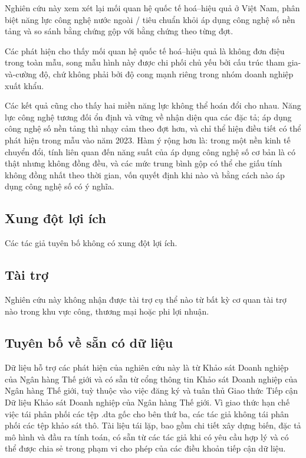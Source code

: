 \documentclass[12pt,a4paper]{article}
\begin{document}
Nghiên cứu này xem xét lại mối quan hệ quốc tế hoá--hiệu quả ở Việt Nam,
phân biệt năng lực công nghệ nước ngoài / tiêu chuẩn khỏi áp dụng công
nghệ số nền tảng và so sánh bằng chứng gộp với bằng chứng theo từng đợt.

Các phát hiện cho thấy mối quan hệ quốc tế hoá--hiệu quả là không đơn
điệu trong toàn mẫu, song mẫu hình này được chi phối chủ yếu bởi cấu
trúc tham gia-và-cường độ, chứ không phải bởi độ cong mạnh riêng trong
nhóm doanh nghiệp xuất khẩu.

Các kết quả cũng cho thấy hai miền năng lực không thể hoán đổi cho nhau.
Năng lực công nghệ tương đối ổn định và vững về nhận diện qua các đặc
tả; áp dụng công nghệ số nền tảng thì nhạy cảm theo đợt hơn, và chỉ thể
hiện điều tiết có thể phát hiện trong mẫu vào năm 2023. Hàm ý rộng hơn
là: trong một nền kinh tế chuyển đổi, tính liên quan đến năng suất của
áp dụng công nghệ số cơ bản là có thật nhưng không đồng đều, và các mức
trung bình gộp có thể che giấu tính không đồng nhất theo thời gian, vốn
quyết định khi nào và bằng cách nào áp dụng công nghệ số có ý nghĩa.

\hypertarget{xung-ux111ux1ed9t-lux1ee3i-uxedch}{%
\subsection{Xung đột lợi ích}\label{xung-ux111ux1ed9t-lux1ee3i-uxedch}}

Các tác giả tuyên bố không có xung đột lợi ích.

\hypertarget{tuxe0i-trux1ee3}{%
\subsection{Tài trợ}\label{tuxe0i-trux1ee3}}

Nghiên cứu này không nhận được tài trợ cụ thể nào từ bất kỳ cơ quan tài
trợ nào trong khu vực công, thương mại hoặc phi lợi nhuận.

\hypertarget{tuyuxean-bux1ed1-vux1ec1-sux1eb5n-cuxf3-dux1eef-liux1ec7u}{%
\subsection{Tuyên bố về sẵn có dữ
liệu}\label{tuyuxean-bux1ed1-vux1ec1-sux1eb5n-cuxf3-dux1eef-liux1ec7u}}

Dữ liệu hỗ trợ các phát hiện của nghiên cứu này là từ Khảo sát Doanh
nghiệp của Ngân hàng Thế giới và có sẵn từ cổng thông tin Khảo sát Doanh
nghiệp của Ngân hàng Thế giới, tuỳ thuộc vào việc đăng ký và tuân thủ
Giao thức Tiếp cận Dữ liệu Khảo sát Doanh nghiệp của Ngân hàng Thế giới.
Vì giao thức hạn chế việc tái phân phối các tệp .dta gốc cho bên thứ ba,
các tác giả không tái phân phối các tệp khảo sát thô. Tài liệu tái lặp,
bao gồm chi tiết xây dựng biến, đặc tả mô hình và đầu ra tính toán, có
sẵn từ các tác giả khi có yêu cầu hợp lý và có thể được chia sẻ trong
phạm vi cho phép của các điều khoản tiếp cận dữ liệu.
\end{document}
